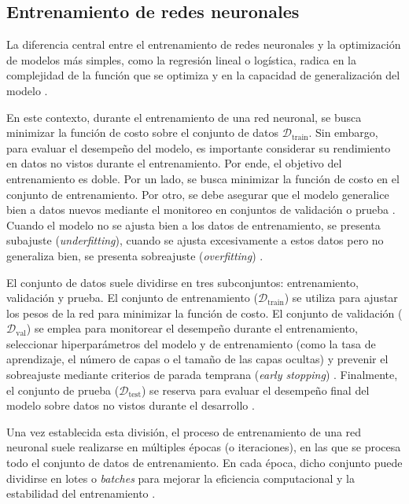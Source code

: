 \subsection{Entrenamiento de redes neuronales}
\label{sec:entrenamiento_redes_neuronales}
La diferencia central entre el entrenamiento de redes neuronales y la optimización de modelos más simples, como la regresión lineal o logística, radica en la complejidad de la función que se optimiza y en la capacidad de generalización del modelo \cite{Goodfellow2016}.

En este contexto, durante el entrenamiento de una red neuronal, se busca minimizar la función de costo sobre el conjunto de datos $\mathcal{D}_{\mathrm{train}}$. Sin embargo, para evaluar el desempeño del modelo, es importante considerar su rendimiento en datos no vistos durante el entrenamiento. Por ende, el objetivo del entrenamiento es doble. Por un lado, se busca minimizar la función de costo en el conjunto de entrenamiento. Por otro, se debe asegurar que el modelo generalice bien a datos nuevos mediante el monitoreo en conjuntos de validación o prueba \cite{Goodfellow2016}. Cuando el modelo no se ajusta bien a los datos de entrenamiento, se presenta subajuste (\textit{underfitting}), cuando se ajusta excesivamente a estos datos pero no generaliza bien, se presenta sobreajuste (\textit{overfitting}) \cite{Goodfellow2016}.

El conjunto de datos suele dividirse en tres subconjuntos: entrenamiento, validación y prueba. El conjunto de entrenamiento ($\mathcal{D}_{\mathrm{train}}$) se utiliza para ajustar los pesos de la red para minimizar la función de costo. El conjunto de validación ($\mathcal{D}_{\mathrm{val}}$) se emplea para monitorear el desempeño durante el entrenamiento, seleccionar hiperparámetros del modelo y de entrenamiento (como la tasa de aprendizaje, el número de capas o el tamaño de las capas ocultas) y prevenir el sobreajuste mediante criterios de parada temprana (\textit{early stopping}) \cite{Oymak2021}. Finalmente, el conjunto de prueba ($\mathcal{D}_{\mathrm{test}}$) se reserva para evaluar el desempeño final del modelo sobre datos no vistos durante el desarrollo \cite{vanderGoot2021}.

Una vez establecida esta división, el proceso de entrenamiento de una red neuronal suele realizarse en múltiples épocas (o iteraciones), en las que se procesa todo el conjunto de datos de entrenamiento. En cada época, dicho conjunto puede dividirse en lotes o \textit{batches} para mejorar la eficiencia computacional y la estabilidad del entrenamiento \cite{Goodfellow2016}.

